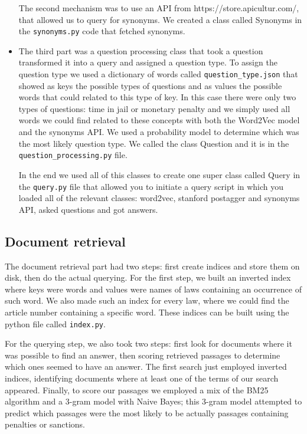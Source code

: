 \documentclass[letterpaper, margin=1in]{article}
\begin{document}
\begin{itemize}
The second mechanism was to use an API from https://store.apicultur.com/, 
that allowed us to query for synonyms. We created a class called Synonyms in the \texttt{synonyms.py} code that fetched synonyms. 

\item The third part was a question processing class that took a question transformed it into a query and assigned a question type. To assign the question type we used a dictionary of words
called \texttt{question{\_}type.json} that showed as keys the possible types of questions 
and as values the possible words that could related to this type of key. In this case there
were only two types of questions: time in jail or monetary penalty and we simply used all words we could find related to these concepts with both the Word2Vec model and the synonyms API. We used a probability model to determine which was the most likely question type. We called the class Question and it is in the \texttt{question{\_}processing.py} file.


In the end we used all of this classes to create one super class called Query in the \texttt{query.py} file that allowed you to initiate a query script in which you loaded all of the relevant classes: word2vec, stanford postagger and synonyms API, asked questions and got answers. 

\end{itemize} 

\subsection{Document retrieval}
The document retrieval part had two steps: first create indices and store them on disk, then do the actual querying. For the first step, we built an inverted index where keys were words and values were names of laws containing an occurrence of such word. We also made such an index for every law, where we could find the article number containing a specific word.  These indices can be built using the python file called \texttt{index.py}. 

For the querying step, we also took two steps: first look for documents where it was possible to find an answer, then scoring retrieved passages to determine which ones seemed to have an answer. The first search just employed inverted indices, identifying documents where at least one of the terms of our search appeared. Finally, to score our passages we employed a mix of the BM25 algorithm and a 3-gram model with Naive Bayes; this 3-gram model attempted to predict which passages were the most likely to be actually passages containing penalties or sanctions.
\end{document}
